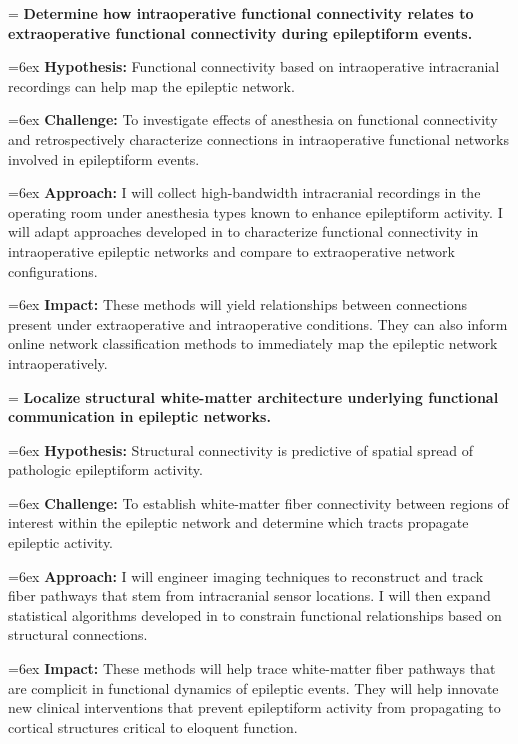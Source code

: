 \hangindent=\parindent
{}
\noindent
{} \textbf{Determine how intraoperative functional connectivity relates to extraoperative functional connectivity during epileptiform events.}

\hangindent=6ex
\textbf{Hypothesis:} Functional connectivity based on intraoperative intracranial recordings can help map the epileptic network.

\hangindent=6ex
\textbf{Challenge:} To investigate effects of anesthesia on functional connectivity and retrospectively characterize connections in intraoperative functional networks involved in epileptiform events.

\hangindent=6ex
\textbf{Approach:} I will collect high-bandwidth intracranial recordings in the operating room under anesthesia types known to enhance epileptiform activity. I will adapt approaches developed in  to characterize functional connectivity in intraoperative epileptic networks and compare to extraoperative network configurations.

\hangindent=6ex
\textbf{Impact:} These methods will yield relationships between connections present under extraoperative and intraoperative conditions. They can also inform online network classification methods to immediately map the epileptic network intraoperatively.


\hangindent=\parindent
{}
\noindent
{} \textbf{Localize structural white-matter architecture underlying functional communication in epileptic networks.}

\hangindent=6ex
\textbf{Hypothesis:} Structural connectivity is predictive of spatial spread of pathologic epileptiform activity.

\hangindent=6ex
\textbf{Challenge:} To establish white-matter fiber connectivity between regions of interest within the epileptic network and determine which tracts propagate epileptic activity.

\hangindent=6ex
\textbf{Approach:} I will engineer imaging techniques to reconstruct and track fiber pathways that stem from intracranial sensor locations. I will then expand statistical algorithms developed in  to constrain functional relationships based on structural connections.

\hangindent=6ex
\textbf{Impact:} These methods will help trace white-matter fiber pathways that are complicit in functional dynamics of epileptic events. They will help innovate new clinical interventions that prevent epileptiform activity from propagating to cortical structures critical to eloquent function.
